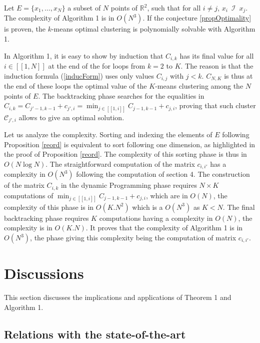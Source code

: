 \documentclass{meta}
\def\RR{{\mathbb{R}}}
\def\CC{{\mathcal{C}}}
\begin{document}
\begin{theorem}%
Let  $E =\{x_1,\dots, x_N\}$ a subset of $N$ points  of $\RR^2$, %
such that for all $ i\neq j$, $x_i \phantom{0} \mathcal{I} \phantom{0} x_j$.
The complexity of Algorithm 1 is in $O(N^3)$.
If the conjecture \ref{propOptimality} is proven, the $k$-means optimal  clustering is polynomially solvable with Algorithm 1.
\end{theorem}

In Algorithm 1, it is easy to show by induction that 
$C_{i,k}$ has its final value for all $i \in [\![1,N]\!]$ at the end of the for loops from $k=2$ to $K$.
The reason is that the induction formula (\ref{inducForm}) uses only values $C_{i,j}$ with $j<k$.
$C_{N,K}$ is thus at the end of these loops the optimal value
of the $K$-means clustering among the $N$ points of $E$.
The backtracking phase searches for the equalities in $C_{i,k} = C_{j'-1,k-1} + c_{j',i} =\min_{j \in [\![1,i]\!]} C_{j-1,k-1} + c_{j,i}$,
proving that such cluster $\CC_{j',i}$ allows to give an optimal solution.

Let us analyze the complexity.
Sorting and indexing the elements of $E$ following Proposition \ref{reord}
is equivalent to sort following one dimension, as highlighted in the proof of Proposition \ref{reord}.
The complexity of this sorting phase is thus in $O(N\log N)$.
The straightforward computation of the matrix $c_{i,i'}$  has a complexity in $O(N^3)$
following the computation of section 4.
The construction of the matrix $C_{i,k}$ in the dynamic Programming phase requires $N\times K$
computations of $\min_{j \in [\![1,i]\!]} C_{j-1,k-1} + c_{j,i}$, which are in $O(N)$,
the complexity of this phase is in  $O(K.N^2)$ which is a $O(N^3)$ as $K < N$.
The final backtracking phase requires $K$ computations having a complexity in $O(N)$, the complexity is in $O(K.N)$.
It proves that the complexity of Algorithm 1 is in $O(N^3)$, the phase giving this complexity being the computation
of matrix $c_{i,i'}$.


\section{Discussions}

This section discusses the implications and applications of Theorem 1 and Algorithm 1.

\subsection{Relations with the state-of-the-art}
\end{document}

